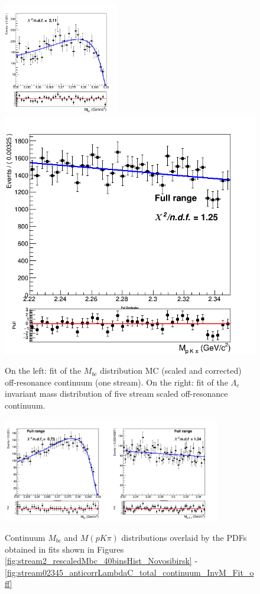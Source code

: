 \begin{figure}[H]
\centering
\subcaptionbox{\label{fig:stream2_rescaledMbc_40binsHist_Novosibirsk}}
{\includegraphics[width=0.45\textwidth]{06-chargedAnticorrBtoLambda/figs/stream2_rescaledMbc_40binsHist_Novosibirsk.png}} \quad
\subcaptionbox{\label{fig:stream02345_anticorrLambdaC_total_continuum_InvM_Fit_off}}
{\includegraphics[width=.45\textwidth]{06-chargedAnticorrBtoLambda/figs/stream02345_anticorrLambdaC_total_continuum_InvM_Fit_off-resonance.png}} \quad
\caption{On the left: fit of the $M_{bc}$ distribution MC (scaled and corrected) off-resonance continuum (one stream). On the right: fit of the $\Lambda_c$ invariant mass distribution of five stream scaled off-resonance continuum.}
\end{figure}


\begin{figure}[H]
\centering
{\includegraphics[width=0.85\textwidth]{06-chargedAnticorrBtoLambda/figs/stream1_anticorrLambddaC_total_continuum_2DFit_Novosibirsk.png}}
\caption{Continuum $M_{bc}$  and $M(p K \pi)$ distributions overlaid by the PDFs obtained in fits shown in Figures \ref{fig:stream2_rescaledMbc_40binsHist_Novosibirsk} - \ref{fig:stream02345_anticorrLambdaC_total_continuum_InvM_Fit_off}}
\label{fig:stream1_anticorrLambddaC_total_continuum_2DFit_Novosibirsk}
\end{figure}

